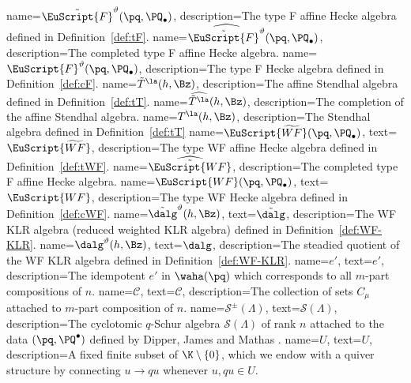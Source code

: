   {
  name={\ensuremath{{\tilde{\EuScript{F}}^\vartheta (\pq,\PQ_{\bullet})}}},
   description={The type F affine Hecke algebra defined in
  Definition~\ref{def:tF}.}
 }
       {
  name={\ensuremath{\widehat{\tilde{\EuScript{F}}^\vartheta}
  (\pq,\PQ_\bullet)}},
   description={The completed type F affine Hecke algebra.}
 }   {
  name={\ensuremath{\EuScript{F}^\vartheta
  (\pq,\PQ_\bullet)}},
   description={The type F Hecke algebra defined in
  Definition~\ref{def:cF}.}
 }
   {
  name={{\ensuremath{\tilde{T}^{\boldsymbol{\la}}(h,\Bz)}}},
   description={The affine Stendhal algebra defined in
  Definition~\ref{def:tT}.}
 }
       {
  name={\ensuremath{\widehat{\tilde{T}^{\boldsymbol{{\la}}}}(h,\Bz)}},
   description={The completion of the  affine Stendhal algebra.}
 }
  {
  name={\ensuremath{T^{\boldsymbol{\la}} (h,\Bz)}},
   description={The Stendhal algebra defined in
  Definition~\ref{def:tT}}
  }
    {
  name={\ensuremath{{\EuScript{\widetilde{WF}} (\pq,\PQ_{\bullet})}}},
  text={\ensuremath{{\EuScript{\widetilde{WF}}}}},
   description={The type WF affine Hecke algebra defined in
  Definition~\ref{def:tWF}.}
 }
       {
  name={\ensuremath{\widehat{\tilde{\EuScript{WF}}}}},
   description={The completed type F affine Hecke algebra.}
 }
  {
  name={\ensuremath{\EuScript{{WF}} (\pq,\PQ_{\bullet})}},
  text={\ensuremath{\EuScript{{WF}}}},
   description={The type WF Hecke algebra defined in
  Definition~\ref{def:cWF}.}
 }
    {
  name={{\ensuremath{\tilde{\dalg}^\vartheta (h,\Bz)}}},
  text={{\ensuremath{\tilde{\dalg}}}},
   description={The WF KLR algebra (reduced weighted KLR algebra) defined in
  Definition~\ref{def:WF-KLR}.}
 }
  {
  name={\ensuremath{\dalg ^\vartheta (h,\Bz)}},
  text={\ensuremath{\dalg}},
   description={The steadied quotient of the WF KLR algebra defined in
  Definition~\ref{def:WF-KLR}.}
  }
  {
  name={\ensuremath{e'}},
  text={\ensuremath{e'}},
   description={The idempotent $e'$ in $\waha(\pq)$ which corresponds
   to all $m$-part compositions of $n$.}
  }
   {
  name={\ensuremath{\mathscr{C}}},
  text={\ensuremath{\mathscr{C}}},
   description={The collection of sets $C_\mu$ attached to $m$-part
   composition of $n$.}
  }
     {
  name={\ensuremath{\mathscr{S}^\pm(\Lambda)}},
  text={\ensuremath{\mathscr{S}(\Lambda)}},
   description={The cyclotomic $q$-Schur algebra $\mathscr{S}(\Lambda)$ of rank $n$  attached to the
data $(\pq,\PQ^\bullet)$ defined by Dipper, James and Mathas
\cite[6.1]{DJM}.}
  }
     {
  name={\ensuremath{U}},
  text={\ensuremath{U}},
   description={A fixed finite subset of $\K\setminus\{0\}$, which we
   endow with a quiver structure by connecting $u\to qu$ whenever
   $u,qu\in U$.}
  }

